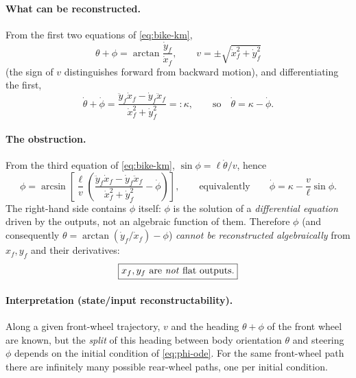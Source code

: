 \documentclass[11pt,a4paper]{article}
\theoremstyle{definition}
\theoremstyle{plain}
\theoremstyle{remark}
\begin{document}
\paragraph{What can be reconstructed.} From the first two equations of \eqref{eq:bike-km},
\[
  \theta+\phi=\arctan\frac{\dot y_f}{\dot x_f},\qquad v=\pm\sqrt{\dot x_f^2+\dot y_f^2}
\]
(the sign of $v$ distinguishes forward from backward motion), and differentiating the first,
\begin{equation}
  \dot\theta+\dot\phi=\frac{\ddot y_f\dot x_f-\dot y_f\ddot x_f}{\dot x_f^2+\dot y_f^2}=:\kappa,\qquad\text{so}\quad \dot\theta=\kappa-\dot\phi .
\end{equation}

\paragraph{The obstruction.} From the third equation of \eqref{eq:bike-km}, $\sin\phi=\ell\dot\theta/v$, hence
\begin{equation}
  \phi=\arcsin\!\left[\frac{\ell}{v}\left(\frac{\ddot y_f\dot x_f-\dot y_f\ddot x_f}{\dot x_f^2+\dot y_f^2}-\dot\phi\right)\right],
  \qquad\text{equivalently}\qquad
  \dot\phi=\kappa-\frac{v}{\ell}\sin\phi .
  \label{eq:phi-ode}
\end{equation}
The right-hand side contains $\dot\phi$ itself: $\phi$ is the solution of a \emph{differential equation} driven by the outputs, not an algebraic function of them. Therefore $\phi$ (and consequently $\theta=\arctan(\dot y_f/\dot x_f)-\phi$) \emph{cannot be reconstructed algebraically} from $x_f,y_f$ and their derivatives:
\[
  \boxed{x_f,y_f\ \text{are \emph{not} flat outputs.}}
\]

\paragraph{Interpretation (state/input reconstructability).} Along a given front-wheel trajectory, $v$ and the heading $\theta+\phi$ of the front wheel are known, but the \emph{split} of this heading between body orientation $\theta$ and steering $\phi$ depends on the initial condition of \eqref{eq:phi-ode}. For the same front-wheel path there are infinitely many possible rear-wheel paths, one per initial condition.
\end{document}
